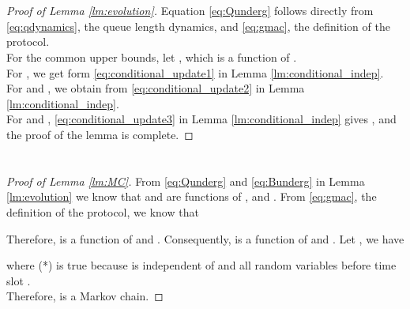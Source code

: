 \documentclass[onecolumn,draftcls]{IEEEtran}
\begin{document}
\section{}
\label{app:lm2}
\begin{proof}[Proof of Lemma \ref{lm:evolution}]
Equation \eqref{eq:Qunderg} follows directly from \eqref{eq:qdynamics}, the queue length dynamics, and \eqref{eq:gmac}, the definition of the  protocol.
\\
For the common upper bounds, 
let , which is a function of .
\\
For ,  we get  form \eqref{eq:conditional_update1} in Lemma \ref{lm:conditional_indep}.
\\
For  and , we obtain
 from \eqref{eq:conditional_update2} in Lemma \ref{lm:conditional_indep}.
\\
For  and , \eqref{eq:conditional_update3} in Lemma \ref{lm:conditional_indep} gives , and the proof of the lemma is complete.

\end{proof}

\section{}
\label{app:lm3}
\begin{proof}[Proof of Lemma \ref{lm:MC}]
From \eqref{eq:Qunderg} and \eqref{eq:Bunderg} in Lemma \ref{lm:evolution} we know that
 and  are functions of 
,  and .
From \eqref{eq:gmac}, the definition of the  protocol, we know that

Therefore,  is a function of  and .
Consequently,  is a function of  and .
Let , we have

where (*) is true because  is independent of  and all random variables before time slot .
\\
Therefore,  is a Markov chain.

\end{proof}
\end{document}
